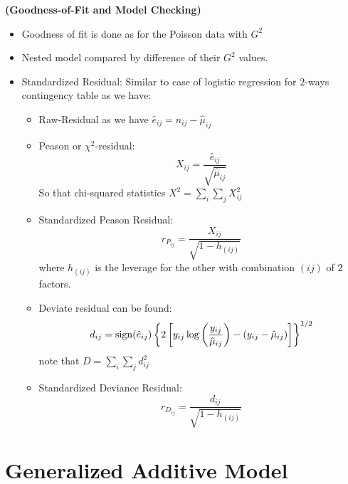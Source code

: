 \begin{remark}{\textbf{(Goodness-of-Fit and Model Checking)}}
   \begin{itemize}
       \item Goodness of fit is done as for the Poisson data with $G^2$
       \item Nested model compared by difference of their $G^2$ values. 
       \item Standardized Residual: Similar to case of logistic regression for $2$-ways contingency table as we have:
       \begin{itemize}
           \item Raw-Residual as we have $\hat{e}_{ij} = n_{ij} - \hat{\mu}_{ij}$
           \item Peason or $\chi^2$-residual:
           \begin{equation*}
               X_{ij} = \frac{\hat{e}_{ij}}{\sqrt{\hat{\mu}_{ij}}}
           \end{equation*}
           So that chi-squared statistics $X^2 = \sum_i\sum_jX_{ij}^2$
           \item Standardized Peason Residual:
           \begin{equation*}
               r_{P_{ij}} = \frac{X_{ij}}{\sqrt{1-h_{(ij)}}}
           \end{equation*}
           where $h_{(ij)}$ is the leverage for the other with combination $(ij)$ of $2$ factors. 
           \item Deviate residual can be found:
           \begin{equation*}
               d_{ij} = \operatorname{sign}(\hat{e}_{ij})\left\{ 2\left[ y_{ij} \log \left( \frac{y_{ij}}{\hat{\mu}_{ij}} \right) - (y_{ij} - \hat{\mu}_{ij})  \right] \right\}^{1/2}
           \end{equation*}
           note that $D = \sum_i\sum_jd_{ij}^2$
           \item Standardized Deviance Residual:
           \begin{equation*}
               r_{D_{ij}} = \frac{d_{ij}}{\sqrt{1-h_{(ij)}}}
           \end{equation*}
       \end{itemize}
   \end{itemize} 
\end{remark}

\section{Generalized Additive Model}

